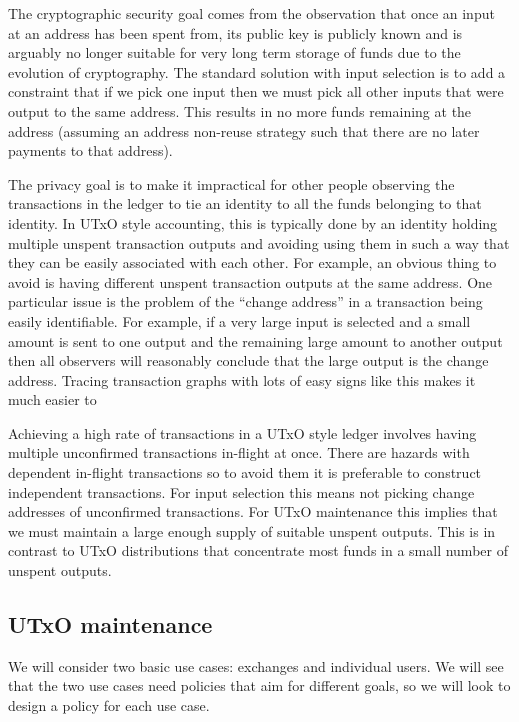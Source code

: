 \documentclass{article}
\begin{document}
The cryptographic security goal comes from the observation that once an input
at an address has been spent from, its public key is publicly known and is
arguably no longer suitable for very long term storage of funds due to the
evolution of cryptography. The standard solution with input selection is to add
a constraint that if we pick one input then we must pick all other inputs that
were output to the same address. This results in no more funds remaining at the
address (assuming an address non-reuse strategy such that there are no later
payments to that address).

The privacy goal is to make it impractical for other people observing the
transactions in the ledger to tie an identity to all the funds belonging to
that identity. In UTxO style accounting, this is typically done by an identity
holding multiple unspent transaction outputs and avoiding using them in such a
way that they can be easily associated with each other. For example, an obvious
thing to avoid is having different unspent transaction outputs at the same
address. One particular issue is the problem of the ``change address'' in a
transaction being easily identifiable. For example, if a very large input is
selected and a small amount is sent to one output and the remaining large
amount to another output then all observers will reasonably conclude that the
large output is the change address. Tracing transaction graphs with lots of
easy signs like this makes it much easier to

Achieving a high rate of transactions in a UTxO style ledger involves having
multiple unconfirmed transactions in-flight at once. There are hazards with
dependent in-flight transactions so to avoid them it is preferable to construct
independent transactions. For input selection this means not picking change
addresses of unconfirmed transactions. For UTxO maintenance this implies that
we must maintain a large enough supply of suitable unspent outputs. This is in
contrast to UTxO distributions that concentrate most funds in a small number of
unspent outputs.

\subsection{UTxO maintenance}

We will consider two basic use cases: exchanges and individual users. We will
see that the two use cases need policies that aim for different goals, so we
will look to design a policy for each use case.
\end{document}
